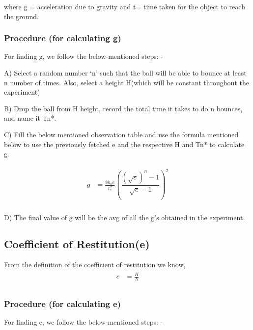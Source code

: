 \documentclass[11pt]{scrartcl} %
\begin{document}
where g = acceleration due to gravity and t= time taken for the object to reach the ground. \par

\subsubsection{Procedure (for calculating g)}
For finding g, we follow the below-mentioned steps: - \par

A) Select a random number ‘n’ such that the ball will be able to bounce at least n number of times. Also, select a height H(which will be constant throughout the experiment)\par

B) Drop the ball from H height, record the total time it takes to do n bounces, and name it Tn*. \par

C) Fill the below mentioned observation table and use the formula mentioned below to use the previously fetched e and the respective H and Tn* to calculate g. \par
\begin{align} 
	\begin{split}
		g &= \frac{8h_{o}e}{t_{*}^{2}}\left(\dfrac{(\sqrt{e})^n-1}{\sqrt{e}-1}\right)^2\\
	\end{split}					
\end{align}
	 
D) The final value of g will be the avg of all the g’s obtained in the experiment. \par


\subsection{Coefficient of Restitution(e)}
From the definition of the coefficient of restitution we know, 
\begin{align} 
	\begin{split}
		e &= \frac{H}{h}\\
	\end{split}					
\end{align}

\subsubsection{Procedure (for calculating e)}
For finding e, we follow the below-mentioned steps: - \par
\end{document}
